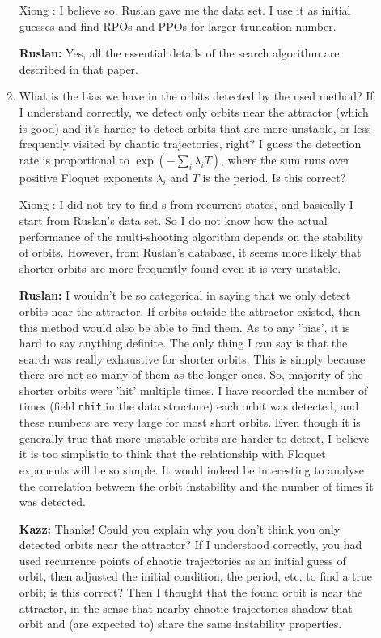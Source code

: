 \begin{description}
\begin{enumerate}
Xiong : I believe so. Ruslan gave me the data set. I use it as initial
guesses and find RPOs and PPOs for larger truncation number.

{\bf Ruslan:} Yes, all the essential details of the search algorithm are described in that paper.

\item
What is the bias we have in the orbits detected by the used method? If I understand correctly, we detect only orbits near the attractor (which is good) and it's harder to detect orbits that are more unstable, or less frequently visited by chaotic trajectories, right? I guess the detection rate is proportional to $\exp(-\sum_i \lambda_i T)$, where the sum runs over positive Floquet exponents $\lambda_i$ and $T$ is the period. Is this correct?

Xiong : I did not try to find \po s from recurrent states, and
basically I start from Ruslan's data set. So I do not know how
the actual performance of the multi-shooting
algorithm depends on the stability of orbits.
However, from Ruslan's database, it seems more likely that
shorter orbits are more frequently found even it is very unstable.

{\bf Ruslan:} I wouldn't be so categorical in saying that we only detect orbits near the attractor.  If orbits outside the attractor existed, then this method would also be able to find them.  As to any 'bias', it is hard to say anything definite.  The only thing I can say is that the search was really exhaustive for shorter orbits.  This is simply because there are not so many of them as the longer ones.  So, majority of the shorter orbits were 'hit' multiple times.  I have recorded the number of times (field {\tt nhit} in the data structure) each orbit was detected, and these numbers are very large for most short orbits.   Even though it is generally true that more unstable orbits are harder to detect, I believe it is too simplistic to think that the relationship with Floquet exponents will be so simple.  It would indeed be interesting to analyse the correlation between the orbit instability and the number of times it was detected.

{\bf Kazz:} Thanks! Could you explain why you don't think you only detected orbits near the attractor? If I understood correctly, you had used recurrence points of chaotic trajectories as an initial guess of orbit, then adjusted the initial condition, the period, etc. to find a true orbit; is this correct? Then I thought that the found orbit is near the attractor, in the sense that nearby chaotic trajectories shadow that orbit and (are expected to) share the same instability properties.


\end{enumerate}
\end{description}
